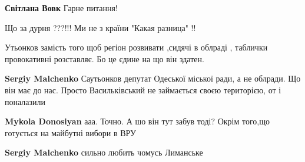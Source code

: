 \begin{itemize}
\begin{itemize}
\textbf{Світлана Вовк} Гарне питання!
\end{itemize}

 
Що за дурня ???!!! Ми не з країни "Какая разница" !!

 
Утьонков замість того щоб регіон розвивати ,сидячі в облраді , таблички провокативні розставляє. Бо це єдине на що він здатен.

\begin{itemize}
 
\textbf{Sergiy Malchenko} Саутьонков депутат Одеської міської ради, а не облради. Що він має до нас. Просто Васильківський не займається своєю територією, от і поналазили

 
\textbf{Mykola Donosiyan} ааа. Точно. А шо він тут забув тоді? Окрім того,що готується на майбутні вибори в ВРУ

 
\textbf{Sergiy Malchenko} сильно любить чомусь Лиманське

 

\end{itemize}
\end{itemize}
